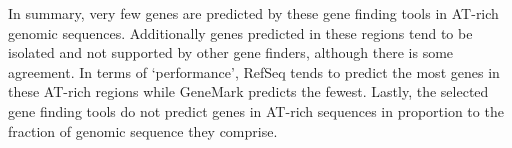 In summary, very few genes are predicted by these gene finding tools
in AT-rich genomic sequences. Additionally genes predicted in these
regions tend to be isolated and not supported by other gene finders,
although there is some agreement. In terms of `performance', RefSeq
tends to predict the most genes in these AT-rich regions while
GeneMark predicts the fewest. Lastly, the selected gene finding tools
do not predict genes in AT-rich sequences in proportion to the
fraction of genomic sequence they comprise.
